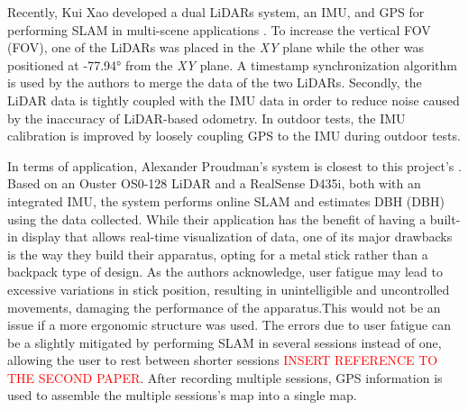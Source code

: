 Recently, Kui Xao developed a dual \acs*{LiDAR}s system, an \acs*{IMU}, and \acs*{GPS} for performing \acs*{SLAM} in multi-scene applications \cite{xiao_high-precision_2022}. To increase the vertical \acl*{FOV} (\acs*{FOV}), one of the \acs*{LiDAR}s was placed in the \textit{XY} plane while the other was positioned at -77.94° from the \textit{XY} plane. A timestamp synchronization algorithm is used by the authors to merge the data of the two \acs*{LiDAR}s. Secondly, the \acs*{LiDAR} data is tightly coupled with the IMU data in order to reduce noise caused by the inaccuracy of \acs*{LiDAR}-based odometry. In outdoor tests, the \acs*{IMU} calibration is improved by loosely coupling \acs*{GPS} to the \acs*{IMU} during outdoor tests.

In terms of application, Alexander Proudman's system is closest to this project's \cite{proudman_online_2021}. Based on an Ouster OS0-128 \acs{LiDAR} and a RealSense D435i, both with an integrated \acs{IMU}, the system performs online \acs{SLAM} and estimates \acl{DBH} (\acs*{DBH}) using the data collected. While their application has the benefit of having a built-in display that allows real-time visualization of data, one of its major drawbacks is the way they build their apparatus, opting for a metal stick rather than a backpack type of design. As the authors acknowledge, user fatigue may lead to excessive variations in stick position, resulting in unintelligible and uncontrolled movements, damaging the performance of the apparatus.This would not be an issue if a more ergonomic structure was used. The errors due to user fatigue can be a slightly mitigated by performing \acs{SLAM} in several sessions instead of one, allowing the user to rest between shorter sessions \textcolor{red}{INSERT REFERENCE TO THE SECOND PAPER}. After recording multiple sessions, \acs*{GPS} information is used to assemble the multiple sessions's map into a single map.